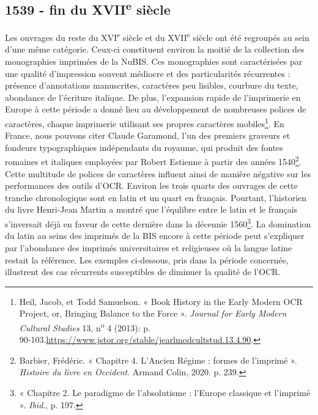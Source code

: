 \documentclass[a4paper,12pt,twoside]{book}
\begin{document}
\subsection{1539 - fin du XVII\textsuperscript{e} siècle}

Les ouvrages du reste du XVI\textsuperscript{e} siècle et du
XVII\textsuperscript{e} siècle ont été regroupés au sein d'une même
catégorie. Ceux-ci constituent environ la moitié de la collection des
monographies imprimées de la NuBIS. Ces monographies sont caractérisées
par une qualité d'impression souvent médiocre et des particularités
récurrentes : présence d'annotations manuscrites, caractères peu
lisibles, courbure du texte, abondance de l'écriture italique. De plus,
l'expansion rapide de l'imprimerie en Europe à cette période a donné
lieu au développement de nombreuses polices de caractères, chaque
imprimerie utilisant ses propres caractères mobiles\footnote{Heil,
	Jacob, et Todd Samuelson. « Book History in the Early Modern OCR
	Project, or, Bringing Balance to the Force ». \emph{Journal for Early
		Modern Cultural Studies} 13, n\textsuperscript{o} 4 (2013): p.
	90‑103.\url{https://www.jstor.org/stable/jearlmodcultstud.13.4.90}.}. En France, nous pouvons citer Claude Garamond, l'un des premiers graveurs et fondeurs typographiques indépendants du royaume, qui produit des fontes romaines et italiques employées par Robert Estienne à partir des années 1540\footnote{Barbier, Frédéric. « Chapitre 4. L'Ancien Régime : formes de l'imprimé ». \emph{Histoire du livre en Occident}. Armand Colin, 2020. p. 239.}. \\

Cette multitude de polices de caractères influent ainsi de manière négative sur les performances des outils
d'OCR. Environ les trois quarts des ouvrages de cette tranche
chronologique sont en latin et un quart en français. Pourtant, l'historien du livre Henri-Jean Martin a montré que l'équlibre entre le latin et le français s'inversait déjà en faveur de cette dernière dans la décennie 1560\footnote{« Chapitre 2. Le paradigme de l'absolutisme : l'Europe classique et l'imprimé ». \emph{Ibid}., p. 197.}. La domination du latin au seins des imprimés de la BIS encore à cette période peut s'expliquer par l'abondance des imprimés universitaires et religieuses où la langue latine restait la référence. Les exemples
ci-dessous, pris dans la période concernée, illustrent des cas
récurrents susceptibles de diminuer la qualité de l'OCR.
\end{document}
